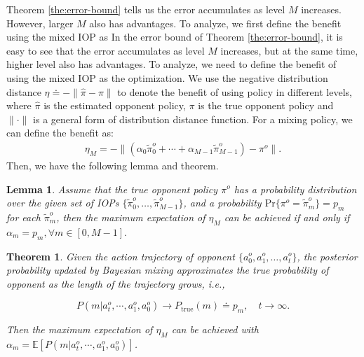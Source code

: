 \documentclass{article}
\newtheorem{theorem}{Theorem}
\newtheorem{lemma}{Lemma}
\begin{document}
Theorem \ref{the:error-bound} tells us the error accumulates as level $M$ increases. However, larger $M$ also has advantages. To analyze, we first define the benefit using the mixed IOP as
In the error bound of Theorem \ref{the:error-bound}, it is easy to see that the error accumulates as level $M$ increases, but at the same time, higher level also has advantages. To analyze, we need to define the benefit of using the mixed IOP as
the optimization. We use the negative distribution distance $\eta\doteq -\|\hat{\pi}-\pi\|$ to denote the benefit of using policy in different levels, where $\hat{\pi}$ is the estimated opponent policy, $\pi$ is the true opponent policy and $\|\cdot\|$ is a general form of distribution distance function. For a mixing policy, we can define the benefit as:
\begin{align*}
    \eta_M=-\|(\alpha_0\tilde{\pi}^o_0+\cdots+\alpha_{M-1}\tilde{\pi}^o_{M-1})-\pi^o\|.
\end{align*}
Then, we have the following lemma and theorem.
\begin{lemma}\label{lem:max-benefit}
Assume that the true opponent policy $\pi^o$ has a probability distribution over the given set of IOPs $\{\tilde{\pi}^o_0,\ldots,\tilde{\pi}^o_{M-1}\}$, and a probability $\mathrm{Pr}\{\pi^o=\tilde{\pi}_m^o\} = p_m$ for each $\tilde{\pi}_m^o$, then the maximum expectation of $\eta_M$ can be achieved if and only if $\alpha_m=p_m, \forall m\in[0,M-1].$
\end{lemma}

\begin{theorem}\label{the:mix-benefit}
Given the action trajectory of opponent $\{a^o_0,a^o_1,\ldots,a^o_t\}$, the posterior probability updated by Bayesian mixing approximates the true probability of opponent as the length of the trajectory grows, \textit{i.e.},

\begin{equation*}
    P(m|a^o_t,\cdots,a^o_1,a^o_0)\to P_{\operatorname{true}}(m)\doteq p_m, \quad t\to \infty.
\end{equation*}

Then the maximum expectation of $\eta_M$ can be achieved with $\alpha_m=\mathbb{E}[P(m|a^o_t,\cdots,a^o_1,a^o_0)]$.
\end{theorem}

\end{document}
